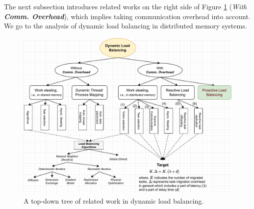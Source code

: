 The next subsection introduces related works on the right side of Figure \ref{fig:preli_relatedwork_tree} (\textit{With \textbf{Comm. Overhead}}), which implies taking communication overhead into account. We go to the analysis of dynamic load balancing in distributed memory systems.

\begin{figure}[t]
	\centering
	\includegraphics[scale=0.75]{./pictures/preliminaries/preli_dynamiclb_and_relatedwork.pdf}
	\caption{A top-down tree of related work in dynamic load balancing.}
	\label{fig:preli_relatedwork_tree}
\end{figure}



